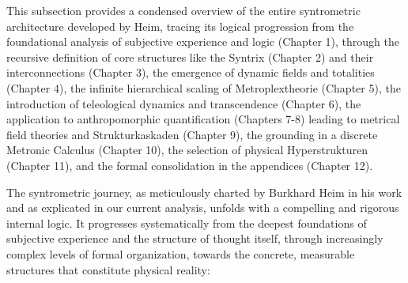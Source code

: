 \documentclass[12pt]{article}
\begin{document}
This subsection provides a condensed overview of the entire syntrometric architecture developed by Heim, tracing its logical progression from the foundational analysis of subjective experience and logic (Chapter 1), through the recursive definition of core structures like the Syntrix (Chapter 2) and their interconnections (Chapter 3), the emergence of dynamic fields and totalities (Chapter 4), the infinite hierarchical scaling of Metroplextheorie (Chapter 5), the introduction of teleological dynamics and transcendence (Chapter 6), the application to anthropomorphic quantification (Chapters 7-8) leading to metrical field theories and Strukturkaskaden (Chapter 9), the grounding in a discrete Metronic Calculus (Chapter 10), the selection of physical Hyperstrukturen (Chapter 11), and the formal consolidation in the appendices (Chapter 12).

The syntrometric journey, as meticulously charted by Burkhard Heim in his work and as explicated in our current analysis, unfolds with a compelling and rigorous internal logic. It progresses systematically from the deepest foundations of subjective experience and the structure of thought itself, through increasingly complex levels of formal organization, towards the concrete, measurable structures that constitute physical reality:
\end{document}
